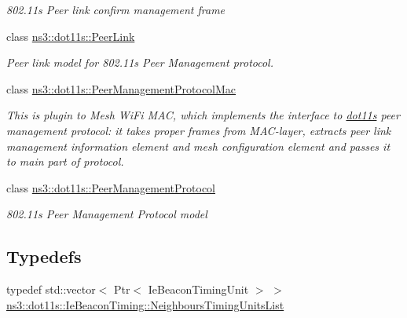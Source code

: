 \begin{DoxyCompactItemize}
\begin{DoxyCompactList}\small\item\em 802.\+11s Peer link confirm management frame \end{DoxyCompactList}\item 
class \hyperlink{classns3_1_1dot11s_1_1PeerLink}{ns3\+::dot11s\+::\+Peer\+Link}
\begin{DoxyCompactList}\small\item\em Peer link model for 802.\+11s Peer Management protocol. \end{DoxyCompactList}\item 
class \hyperlink{classns3_1_1dot11s_1_1PeerManagementProtocolMac}{ns3\+::dot11s\+::\+Peer\+Management\+Protocol\+Mac}
\begin{DoxyCompactList}\small\item\em This is plugin to Mesh Wi\+Fi M\+AC, which implements the interface to \hyperlink{namespacens3_1_1dot11s}{dot11s} peer management protocol\+: it takes proper frames from M\+A\+C-\/layer, extracts peer link management information element and mesh configuration element and passes it to main part of protocol. \end{DoxyCompactList}\item 
class \hyperlink{classns3_1_1dot11s_1_1PeerManagementProtocol}{ns3\+::dot11s\+::\+Peer\+Management\+Protocol}
\begin{DoxyCompactList}\small\item\em 802.\+11s Peer Management Protocol model \end{DoxyCompactList}\end{DoxyCompactItemize}
\subsection*{Typedefs}
\begin{DoxyCompactItemize}
\item 
typedef std\+::vector$<$ Ptr$<$ Ie\+Beacon\+Timing\+Unit $>$ $>$ \hyperlink{group__dot11s_ga8dbec40aea7e1014f0af23de3b31a78c}{ns3\+::dot11s\+::\+Ie\+Beacon\+Timing\+::\+Neighbours\+Timing\+Units\+List}
\end{DoxyCompactItemize}
